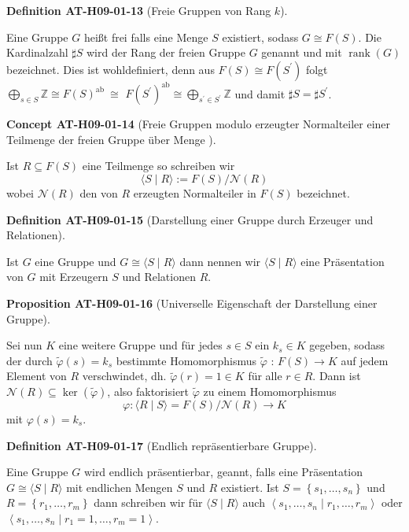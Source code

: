 \documentclass[10pt, letterpaper]{article}
\newcommand{\CustomHeading}[3]{%
  \par\medskip\noindent%
  \textbf{#1 #2} \textnormal{(#3)}.\enskip%
}
\newenvironment{DEF}[2]{\CustomHeading{Definition}{#1}{#2}}{}
\newenvironment{PROP}[2]{\CustomHeading{Proposition}{#1}{#2}}{}
\newenvironment{CONC}[2]{\CustomHeading{Concept}{#1}{#2}}{}
\begin{document}
\begin{DEF}{AT-H09-01-13}{Freie Gruppen von Rang $k$}
Eine Gruppe $G$ heißt frei falls eine Menge $S$ existiert, sodass $G \cong F(S)$. Die Kardinalzahl $\sharp S$ wird der Rang der freien Gruppe $G$ genannt und mit $\operatorname{rank}(G)$ bezeichnet. Dies ist wohldefiniert, denn aus $F(S) \cong F\left(S^{\prime}\right)$ folgt $\bigoplus_{s \in S} \mathbb{Z} \cong F(S)^{\text {ab }} \cong$ $F\left(S^{\prime}\right)^{\mathrm{ab}} \cong \bigoplus_{s^{\prime} \in S^{\prime}} \mathbb{Z}$ und damit $\sharp S=\sharp S^{\prime}$.
\end{DEF}

\begin{CONC}{AT-H09-01-14}{Freie Gruppen modulo erzeugter Normalteiler einer Teilmenge der freien Gruppe über Menge }
Ist $R \subseteq F(S)$ eine Teilmenge so schreiben wir 
$$\langle S \mid R\rangle:=F(S) / \mathcal{N}(R)$$ 
wobei $\mathcal{N}(R)$ den von $R$ erzeugten Normalteiler in $F(S)$ bezeichnet.
\end{CONC}

\begin{DEF}{AT-H09-01-15}{Darstellung einer Gruppe durch Erzeuger und Relationen}
Ist $G$ eine Gruppe und $G \cong\langle S \mid R\rangle$ dann nennen wir $\langle S \mid R\rangle$ eine Präsentation von $G$ mit Erzeugern $S$ und Relationen $R$.
\end{DEF}

\begin{PROP}{AT-H09-01-16}{Universelle Eigenschaft der Darstellung einer Gruppe}
Sei nun $K$ eine weitere Gruppe und für jedes $s \in S$ ein $k_s \in K$ gegeben, sodass der durch $\tilde{\varphi}(s)=k_s$ bestimmte Homomorphismus $\tilde{\varphi}$ : $F(S) \rightarrow K$ auf jedem Element von $R$ verschwindet, dh. $\tilde{\varphi}(r)=1 \in K$ für alle $r \in R$. Dann ist $\mathcal{N}(R) \subseteq \operatorname{ker}(\tilde{\varphi})$, also faktorisiert $\tilde{\varphi}$ zu einem Homomorphismus 
$$\varphi:\langle R \mid S\rangle=F(S) / \mathcal{N}(R) \rightarrow K$$ 
mit $\varphi(s)=k_s$.
\end{PROP}

\begin{DEF}{AT-H09-01-17}{Endlich repräsentierbare Gruppe}
Eine Gruppe $G$ wird endlich präsentierbar, geannt, falls eine Präsentation $G \cong\langle S \mid R\rangle$ mit endlichen Mengen $S$ und $R$ existiert. Ist $S=\left\{s_1, \ldots, s_n\right\}$ und $R=\left\{r_1, \ldots, r_m\right\}$ dann schreiben wir für $\langle S \mid R\rangle$ auch $\left\langle s_1, \ldots, s_n \mid r_1, \ldots, r_m\right\rangle$ oder $\left\langle s_1, \ldots, s_n \mid r_1=1, \ldots, r_m=1\right\rangle$.
\end{DEF}
\end{document}
